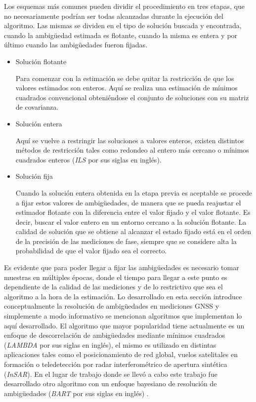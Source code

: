 \documentclass[a4paper,12pt,oneside,onecolumn,final,openright]{book}%
\begin{document}
	Los esquemas más comunes pueden dividir el procedimiento en tres etapas, que no necesariamente podrían ser todas alcanzadas durante la ejecución del algoritmo. Las mismas se dividen en el tipo de solución buscada y encontrada, cuando la ambigüedad estimada es flotante, cuando la misma es entera y por último cuando las ambigüedades fueron fijadas.
\begin{itemize}
	\item Solución flotante
	
	Para comenzar con la estimación se debe quitar la restricción de que los valores estimados son enteros. Aquí se realiza una estimación de mínimos cuadrados convencional obteniéndose el conjunto de soluciones con su matriz de covarianza.
	\item Solución entera
	
	Aquí se vuelve a restringir las soluciones a valores enteros, existen distintos métodos de restricción tales como redondeo al entero más cercano o mínimos cuadrados enteros (\textit{ILS} por sus siglas en inglés).
	\item Solución fija
	
	Cuando la solución entera obtenida en la etapa previa es aceptable se procede a fijar estos valores de ambigüedades, de manera que se pueda reajustar el estimador flotante con la diferencia entre el valor fijado y el valor flotante. Es decir, buscar el valor entero en un entorno cercano a la solución flotante. La calidad de solución que se obtiene al alcanzar el estado fijado está en el orden de la precisión de las mediciones de fase, siempre que se considere alta la probabilidad de que el valor fijado sea el correcto.
\end{itemize}
	
	Es evidente que para poder llegar a fijar las ambigüedades es necesario tomar muestras en múltiples épocas, donde el tiempo para llegar a este punto es dependiente de la calidad de las mediciones y de lo restrictivo que sea el algoritmo a la hora de la estimación. Lo desarrollado en esta sección introduce conceptualmente la resolución de ambigüedades en mediciones GNSS y simplemente a modo informativo se mencionan algoritmos que implementan lo aquí desarrollado. El algoritmo que mayor popularidad tiene actualmente es un enfoque de descorrelación de ambigüedades mediante mínimos cuadrados (\textit{LAMBDA} por sus siglas en inglés), el mismo es utilizado en distintas aplicaciones tales como el posicionamiento de red global, vuelos satelitales en formación o teledetección por radar interferométrico de apertura sintética (\textit{InSAR}). En el lugar de trabajo donde se llevó a cabo este trabajo fue desarrollado otro algoritmo con un enfoque  bayesiano de resolución de ambigüedades (\textit{BART} por sus siglas en inglés) \cite{bart}.
\end{document}
